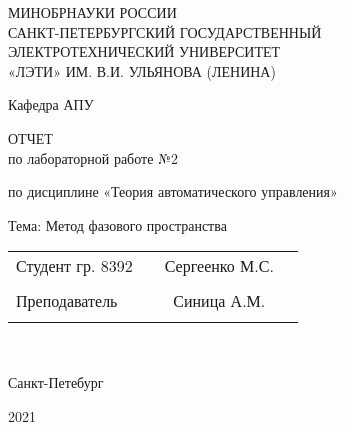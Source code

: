 \begin{titlepage}
\begin{center}
\large
МИНОБРНАУКИ РОССИИ \\
САНКТ-ПЕТЕРБУРГСКИЙ ГОСУДАРСТВЕННЫЙ \\
ЭЛЕКТРОТЕХНИЧЕСКИЙ УНИВЕРСИТЕТ \\
«ЛЭТИ» ИМ. В.И. УЛЬЯНОВА (ЛЕНИНА) \\

\vspace{0.25cm}

Кафедра АПУ


\vfill
\vfill

\textsc{ОТЧЕТ}\\
по лабораторной работе №2

по дисциплине «Теория автоматического управления»

Тема: Метод фазового пространства
\vfill
\vfill

\normalsize{ 
	\begin{tabular}{p{7.67cm} p{4.7cm} cp{5cm}}
		Студент гр. 8392 & \underline{\hspace{4.6cm}} & Сергеенко М.С. \\\\
		Преподаватель & \underline{\hspace{4.6cm}} & Синица А.М. \\\\
	\end{tabular}
}\\
\vfill

	Санкт-Петебург
	
	2021
\end{center}
\end{titlepage}
